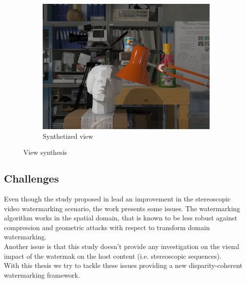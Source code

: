 \begin{figure}[h!]
\begin{subfigure}[]{0.4\textwidth}
\centering
\includegraphics[width=1\textwidth]{./img/synth_view_watermarked.png}
\caption{\small{Synthetized view}}
\label{fig:vs3}
\end{subfigure}
\caption{\small{View synthesis}\label{fig:vs}}
\end{figure}

\subsection{Challenges}

Even though the study proposed in \cite{DOER} lead  an improvement in the stereoscopic video watermarking scenario, the work presents some issues. The watermarking algorithm works in the spatial domain, that is known to be less robust against compression and geometric attacks with respect to transform domain watermarking.\\
Another issue is that this study doesn't provide any investigation on the visual impact of the watermak on the host content (i.e. stereoscopic sequences).\\
With this thesis we try to tackle these issues providing a new disparity-coherent watermarking framework.








